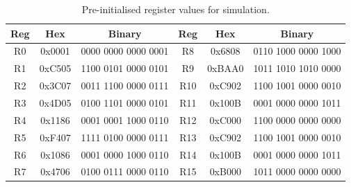 \documentclass[12pt, a4paper]{report}
\begin{document}
\begin{table}[H]
\centering
\caption{Pre-initialised register values for simulation.}
\label{tab:reginit}
\begin{tabular}{ccc|ccc}
\toprule
\textbf{Reg} & \textbf{Hex} & \textbf{Binary} &
\textbf{Reg} & \textbf{Hex} & \textbf{Binary} \\
\midrule
R0  & 0x0001 & 0000 0000 0000 0001 & R8  & 0x6808 & 0110 1000 0000 1000 \\
R1  & 0xC505 & 1100 0101 0000 0101 & R9  & 0xBAA0 & 1011 1010 1010 0000 \\
R2  & 0x3C07 & 0011 1100 0000 0111 & R10 & 0xC902 & 1100 1001 0000 0010 \\
R3  & 0x4D05 & 0100 1101 0000 0101 & R11 & 0x100B & 0001 0000 0000 1011 \\
R4  & 0x1186 & 0001 0001 1000 0110 & R12 & 0xC000 & 1100 0000 0000 0000 \\
R5  & 0xF407 & 1111 0100 0000 0111 & R13 & 0xC902 & 1100 1001 0000 0010 \\
R6  & 0x1086 & 0001 0000 1000 0110 & R14 & 0x100B & 0001 0000 0000 1011 \\
R7  & 0x4706 & 0100 0111 0000 0110 & R15 & 0xB000 & 1011 0000 0000 0000 \\
\bottomrule
\end{tabular}
\end{table}
\end{document}
